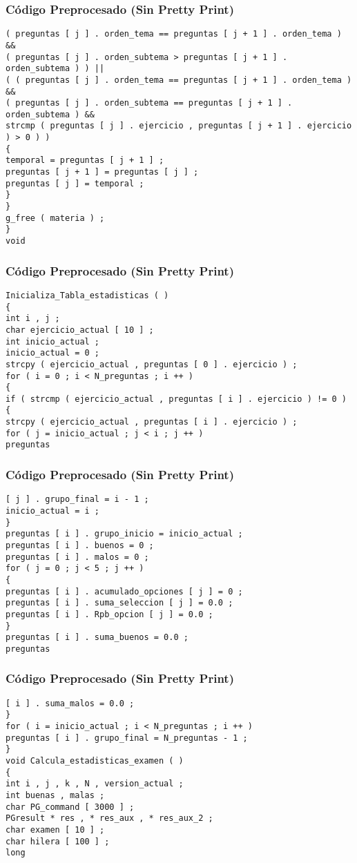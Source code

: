 \documentclass{beamer}
\begin{document}
\begin{frame}[fragile]
\frametitle{C\'odigo Preprocesado (Sin Pretty Print)}
\begin{lstlisting}[style=CStyle]
( preguntas [ j ] . orden_tema == preguntas [ j + 1 ] . orden_tema ) && 
( preguntas [ j ] . orden_subtema > preguntas [ j + 1 ] . orden_subtema ) ) || 
( ( preguntas [ j ] . orden_tema == preguntas [ j + 1 ] . orden_tema ) && 
( preguntas [ j ] . orden_subtema == preguntas [ j + 1 ] . orden_subtema ) && 
strcmp ( preguntas [ j ] . ejercicio , preguntas [ j + 1 ] . ejercicio ) > 0 ) ) 
{ 
temporal = preguntas [ j + 1 ] ; 
preguntas [ j + 1 ] = preguntas [ j ] ; 
preguntas [ j ] = temporal ; 
} 
} 
g_free ( materia ) ; 
} 
void \end{lstlisting}
\end{frame}
\begin{frame}[fragile]
\frametitle{C\'odigo Preprocesado (Sin Pretty Print)}
\begin{lstlisting}[style=CStyle]
Inicializa_Tabla_estadisticas ( ) 
{ 
int i , j ; 
char ejercicio_actual [ 10 ] ; 
int inicio_actual ; 
inicio_actual = 0 ; 
strcpy ( ejercicio_actual , preguntas [ 0 ] . ejercicio ) ; 
for ( i = 0 ; i < N_preguntas ; i ++ ) 
{ 
if ( strcmp ( ejercicio_actual , preguntas [ i ] . ejercicio ) != 0 ) 
{ 
strcpy ( ejercicio_actual , preguntas [ i ] . ejercicio ) ; 
for ( j = inicio_actual ; j < i ; j ++ ) 
preguntas \end{lstlisting}
\end{frame}
\begin{frame}[fragile]
\frametitle{C\'odigo Preprocesado (Sin Pretty Print)}
\begin{lstlisting}[style=CStyle]
[ j ] . grupo_final = i - 1 ; 
inicio_actual = i ; 
} 
preguntas [ i ] . grupo_inicio = inicio_actual ; 
preguntas [ i ] . buenos = 0 ; 
preguntas [ i ] . malos = 0 ; 
for ( j = 0 ; j < 5 ; j ++ ) 
{ 
preguntas [ i ] . acumulado_opciones [ j ] = 0 ; 
preguntas [ i ] . suma_seleccion [ j ] = 0.0 ; 
preguntas [ i ] . Rpb_opcion [ j ] = 0.0 ; 
} 
preguntas [ i ] . suma_buenos = 0.0 ; 
preguntas \end{lstlisting}
\end{frame}
\begin{frame}[fragile]
\frametitle{C\'odigo Preprocesado (Sin Pretty Print)}
\begin{lstlisting}[style=CStyle]
[ i ] . suma_malos = 0.0 ; 
} 
for ( i = inicio_actual ; i < N_preguntas ; i ++ ) 
preguntas [ i ] . grupo_final = N_preguntas - 1 ; 
} 
void Calcula_estadisticas_examen ( ) 
{ 
int i , j , k , N , version_actual ; 
int buenas , malas ; 
char PG_command [ 3000 ] ; 
PGresult * res , * res_aux , * res_aux_2 ; 
char examen [ 10 ] ; 
char hilera [ 100 ] ; 
long \end{lstlisting}
\end{frame}
\end{document}
